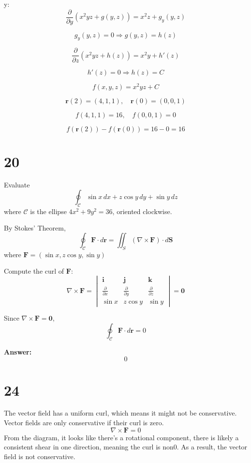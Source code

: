 \documentclass[hidelinks]{article}
\begin{document}
 y:
\[
\frac{\partial}{\partial y} (x^2 yz + g(y, z)) = x^2z + g_y(y, z)
\]

\[
g_y(y, z) = 0 \Rightarrow g(y, z) = h(z)
\]

\[
\frac{\partial}{\partial z} (x^2 yz + h(z)) = x^2 y + h'(z)
\]

\[
h'(z) = 0 \Rightarrow h(z) = C
\]

\[
f(x, y, z) = x^2 yz + C
\]

\[
\mathbf{r}(2) = (4,1,1), \quad \mathbf{r}(0) = (0,0,1)
\]

\[
f(4,1,1) = 16, \quad f(0,0,1) = 0
\]

\[
f(\mathbf{r}(2)) - f(\mathbf{r}(0)) = 16 - 0 = 16
\]



\newpage
\section*{20}
Evaluate 
\[
    \oint_{\mathcal{C}} \sin x \, dx + z \cos y \, dy + \sin y \, dz
\] where $\mathcal{C}$ is the ellipse $4x^2+9y^2 = 36$, oriented clockwise.

By Stokes' Theorem,
\[
\oint_{\mathcal{C}} \mathbf{F} \cdot d\mathbf{r} = \iint_{S} (\nabla \times \mathbf{F}) \cdot d\mathbf{S}
\]
where \(\mathbf{F} = (\sin x, z \cos y, \sin y)\)

Compute the curl of \(\mathbf{F}\):
\[
\nabla \times \mathbf{F} = \begin{vmatrix}
\mathbf{i} & \mathbf{j} & \mathbf{k} \\
\frac{\partial}{\partial x} & \frac{\partial}{\partial y} & \frac{\partial}{\partial z} \\
\sin x & z \cos y & \sin y
\end{vmatrix}
= \mathbf{0}
\]

Since \(\nabla \times \mathbf{F} = \mathbf{0}\),
\[
\oint_{\mathcal{C}} \mathbf{F} \cdot d\mathbf{r} = 0
\]

\textbf{Answer:}
\[
\boxed{0}
\]
\newpage
\section*{24}
The vector field has a uniform curl, which means it might not be conservative. Vector fields are only conservative if their curl is zero. 
\[
    \nabla \times \textbf{F} = 0
\]
From the diagram, it looks like there's a rotational component, there is likely a consistent shear in one direction, meaning the curl is non0. As a result, the vector field is not conservative.
\newpage
\end{document}
